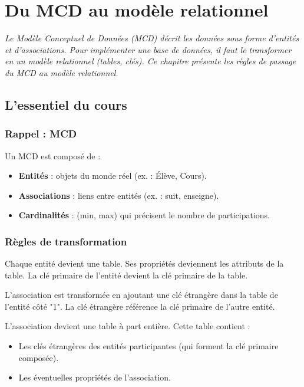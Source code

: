 \chapter{Du MCD au modèle relationnel}

\textit{Le Modèle Conceptuel de Données (MCD) décrit les données sous forme d'entités et d'associations. Pour implémenter une base de données, il faut le transformer en un modèle relationnel (tables, clés). Ce chapitre présente les règles de passage du MCD au modèle relationnel.}

\section{L'essentiel du cours}

\subsection{Rappel : MCD}
Un MCD est composé de :
\begin{itemize}
    \item \textbf{Entités} : objets du monde réel (ex. : Élève, Cours).
    \item \textbf{Associations} : liens entre entités (ex. : suit, enseigne).
    \item \textbf{Cardinalités} : (min, max) qui précisent le nombre de participations.
\end{itemize}

\subsection{Règles de transformation}

\begin{definition}
Chaque entité devient une table. Ses propriétés deviennent les attributs de la table. La clé primaire de l'entité devient la clé primaire de la table.
\end{definition}

\begin{definition}
L'association est transformée en ajoutant une clé étrangère dans la table de l'entité côté "1". La clé étrangère référence la clé primaire de l'autre entité.
\end{definition}

\begin{definition}
L'association devient une table à part entière. Cette table contient :
\begin{itemize}
    \item Les clés étrangères des entités participantes (qui forment la clé primaire composée).
    \item Les éventuelles propriétés de l'association.
\end{itemize}
\end{definition}

